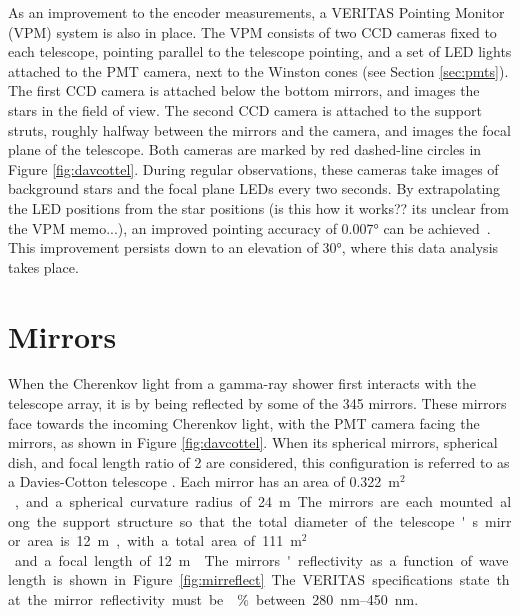 As an improvement to the encoder measurements, a VERITAS Pointing Monitor (VPM) system is also in place.
The VPM consists of two CCD cameras fixed to each telescope, pointing parallel to the telescope pointing, and a set of LED lights attached to the PMT camera, next to the Winston cones (see Section \ref{sec:pmts}).
The first CCD camera is attached below the bottom mirrors, and images the stars in the field of view.
The second CCD camera is attached to the support struts, roughly halfway between the mirrors and the camera, and images the focal plane of the telescope.
Both cameras are marked by red dashed-line circles in Figure \ref{fig:davcottel}.
During regular observations, these cameras take images of background stars and the focal plane LEDs every two seconds.
By extrapolating the LED positions from the star positions {\color{red}(is this how it works?? its unclear from the VPM memo...)}, an improved pointing accuracy of \nicetilde{}\ang{0.007} can be achieved~\cite{VPMmemo}.
%
This improvement persists down to an elevation of \ang{30}, where this data analysis takes place.

\section{Mirrors}\label{sec:mirrors}

When the Cherenkov light from a gamma-ray shower first interacts with the telescope array, it is by being reflected by some of the 345 mirrors.
These mirrors face towards the incoming Cherenkov light, with the PMT camera facing the mirrors, as shown in Figure \ref{fig:davcottel}.
When its spherical mirrors, spherical dish, and focal length ratio of \nicetilde{}2 are considered, this configuration is referred to as a Davies-Cotton telescope \cite{daviescotton}.
Each mirror has an area of \SI{0.322}{m$^2$}, and a spherical curvature radius of \SI{24}{m}.
The mirrors are each mounted along the support structure so that the total diameter of the telescope's mirror area is \SI{12}{m}, with a total area of \SI{111}{m$^2$} and a focal length of \SI{12}{m} \cite{Veritas_Detector}.
The mirrors' reflectivity as a function of wavelength is shown in Figure \ref{fig:mirreflect}.
The VERITAS specifications state that the mirror reflectivity must be \% between \SIrange{280}{450}{nm}.

